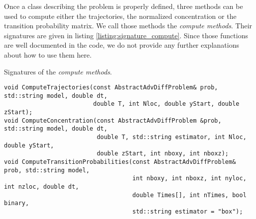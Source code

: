 Once a class describing the problem is properly defined, three methods can be used to compute either the trajectories, the normalized concentration or the transition probability matrix. We call those methods the \textit{compute methods}. Their signatures are given in listing \ref{listing:signature_compute}. Since those functions are well documented in the code, we do not provide any further explanations about how to use them here.
\begin{listing}[ht!]
\caption{Signatures of the \textit{compute methods}.}
\label{listing:signature_compute}
\begin{verbatim}
void ComputeTrajectories(const AbstractAdvDiffProblem& prob, std::string model, double dt,
						 double T, int Nloc, double yStart, double zStart);
void ComputeConcentration(const AbstractAdvDiffProblem &prob, std::string model, double dt,
						  double T, std::string estimator, int Nloc, double yStart,
						  double zStart, int nboxy, int nboxz);
void ComputeTransitionProbabilities(const AbstractAdvDiffProblem& prob, std::string model,
									int nboxy, int nboxz, int nyloc, int nzloc, double dt,
									double Times[], int nTimes, bool binary,
									std::string estimator = "box");
\end{verbatim}
\end{listing}
